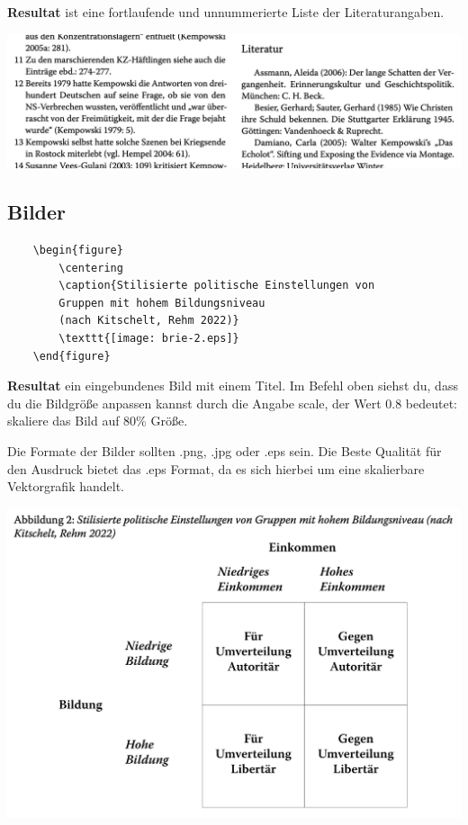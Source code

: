 \documentclass{article}
\begin{document}
\textbf{Resultat} ist eine fortlaufende und unnummerierte Liste der Literaturangaben.

\begin{center}
    \includegraphics[scale=0.4]{literaturverzeichnis.png}
\end{center}

\subsection{Bilder}

\begin{lstlisting}
    \begin{figure}
        \centering
        \caption{Stilisierte politische Einstellungen von 
        Gruppen mit hohem Bildungsniveau 
        (nach Kitschelt, Rehm 2022)}
        \texttt{[image: brie-2.eps]} 
    \end{figure}
\end{lstlisting}

\textbf{Resultat} ein eingebundenes Bild mit einem Titel. Im Befehl oben siehst du, dass du die Bildgröße anpassen kannst durch die Angabe scale, der Wert 0.8 bedeutet: skaliere das Bild auf 80\% Größe.

Die Formate der Bilder sollten .png, .jpg oder .eps sein. Die Beste Qualität für den Ausdruck bietet das .eps Format, da es sich hierbei um eine skalierbare Vektorgrafik handelt.

\begin{center}
    \includegraphics[scale=0.4]{bilder.png}
\end{center}
\end{document}
